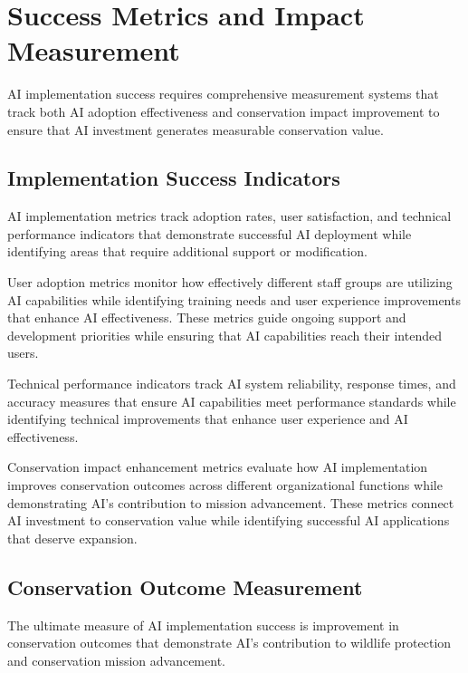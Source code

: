 \documentclass[
  Letterpaper,
]{scrbook}
\begin{document}
\section{Success Metrics and Impact
Measurement}\label{success-metrics-and-impact-measurement}

AI implementation success requires comprehensive measurement systems
that track both AI adoption effectiveness and conservation impact
improvement to ensure that AI investment generates measurable
conservation value.

\subsection{Implementation Success
Indicators}\label{implementation-success-indicators}

AI implementation metrics track adoption rates, user satisfaction, and
technical performance indicators that demonstrate successful AI
deployment while identifying areas that require additional support or
modification.

User adoption metrics monitor how effectively different staff groups are
utilizing AI capabilities while identifying training needs and user
experience improvements that enhance AI effectiveness. These metrics
guide ongoing support and development priorities while ensuring that AI
capabilities reach their intended users.

Technical performance indicators track AI system reliability, response
times, and accuracy measures that ensure AI capabilities meet
performance standards while identifying technical improvements that
enhance user experience and AI effectiveness.

Conservation impact enhancement metrics evaluate how AI implementation
improves conservation outcomes across different organizational functions
while demonstrating AI's contribution to mission advancement. These
metrics connect AI investment to conservation value while identifying
successful AI applications that deserve expansion.

\subsection{Conservation Outcome
Measurement}\label{conservation-outcome-measurement}

The ultimate measure of AI implementation success is improvement in
conservation outcomes that demonstrate AI's contribution to wildlife
protection and conservation mission advancement.
\end{document}
